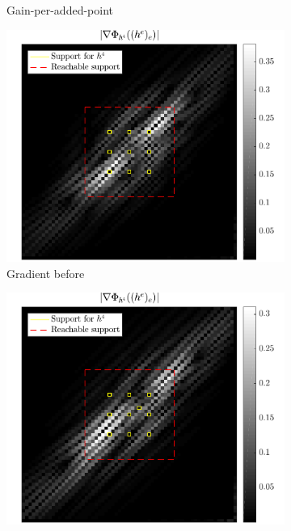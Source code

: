 \begin{figure}[!ht]
\begin{subfigure}[b]{0.32\linewidth}
\caption{Gain-per-added-point} \label{fig_gain_matrix}
\end{subfigure}
\begin{subfigure}[b]{0.32\linewidth}\centering
\includegraphics[width=\linewidth]{figures/before_after/xp_128x128_sc2_angl1_K3_S3_node4before_partgrad4.pdf}
\caption{Gradient before} \label{fig_grad_before}
\end{subfigure}
\begin{subfigure}[b]{0.32\linewidth}\centering
\includegraphics[width=\linewidth]{figures/before_after/xp_128x128_sc2_angl1_K3_S3_node4after_partgrad4.pdf}

\end{subfigure}
\end{figure}
